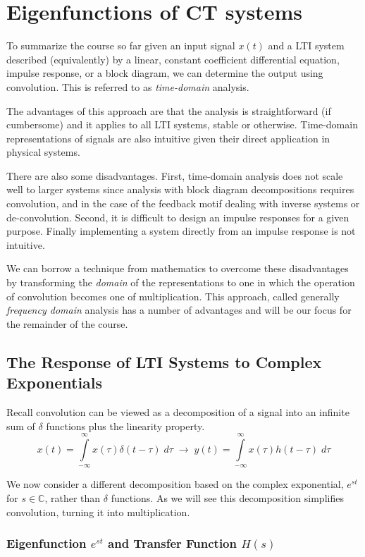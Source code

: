 \chapter{Eigenfunctions of CT systems}
To summarize the course so far given an input signal $x(t)$ and a LTI system described (equivalently) by a linear, constant coefficient differential equation, impulse response, or a block diagram, we can determine the output using convolution. This is referred to as \emph{time-domain} analysis.

The advantages of this approach are that the analysis is straightforward (if cumbersome) and it applies to all LTI systems, stable or otherwise. Time-domain representations of signals are also intuitive given their direct application in physical systems.

There are also some disadvantages. First, time-domain analysis does not scale well to larger systems since analysis with block diagram decompositions requires convolution, and in the case of the feedback motif dealing with inverse systems or de-convolution. Second, it is difficult to design an impulse responses for a given purpose. Finally implementing a system directly from an impulse response is not intuitive.

We can borrow a technique from mathematics to overcome these disadvantages by transforming the \emph{domain} of the representations to one in which the operation of convolution becomes one of multiplication. This approach, called generally \emph{frequency domain} analysis has a number of advantages and will be our focus for the remainder of the course.

\section{The Response of LTI Systems to Complex Exponentials}

Recall convolution can be viewed as a decomposition of a signal into an infinite sum of $\delta$ functions plus the linearity property.
\[
x(t) = \int\limits_{-\infty}^{\infty} x(\tau)\delta(t-\tau) \; d\tau \;\longrightarrow\; y(t) = \int\limits_{-\infty}^{\infty} x(\tau)h(t-\tau) \; d\tau
\]
  
We now consider a different decomposition based on the complex exponential, $e^{st}$ for $s \in \mathbb{C}$, rather than $\delta$ functions. As we will see this decomposition simplifies convolution, turning it into multiplication.

\subsection{Eigenfunction $e^{st}$ and Transfer Function $H(s)$}

